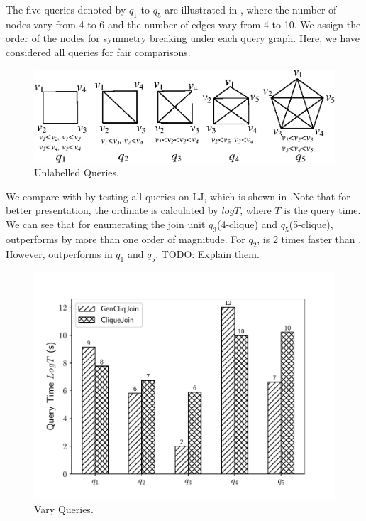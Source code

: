  The five queries denoted by $q_1$ to $q_5$ are illustrated in , where the number of nodes vary from 4 to 6 and the number of edges vary from 4 to 10. We assign the order of the nodes for symmetry breaking\cite{Grochow2007} under each query graph. Here, we have considered all queries for fair comparisons.

\begin{figure}[htb]
  \centering
  \includegraphics[scale=0.6]{figures/unlq.eps}
  \caption{\small{Unlabelled Queries.}}
  \label{fig:unlq}
\end{figure}

 We compare \gencliqjoin with \cliquejoin by testing all queries on LJ, which is shown in .Note that for better presentation, the ordinate is calculated by $logT$, where $T$ is the query time. We can see that for enumerating the join unit $q_3$(4-clique) and $q_5$(5-clique), \gencliqjoin outperforms \cliquejoin by more than one order of magnitude. For $q_2$, \gencliqjoin is 2 times faster than \cliquejoin. However, \cliquejoin outperforms \gencliqjoin in $q_1$ and $q_5$. TODO: Explain them.

\begin{figure}[htb]
  \centering
  \includegraphics[scale=0.4]{figures/exp1.pdf}
  \caption{\small{Vary Queries.}}
  \label{fig:vary_query}
\end{figure}

